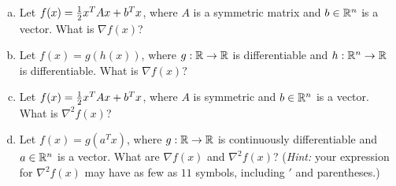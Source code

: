   \begin{enumerate}[(a)]
  \item \label{item:quadratic-gradient}
    Let $f(x) = \frac{1}{2} x^T A x + b^T x$, where $A$ is a symmetric matrix and
    $b \in \mathbb{R}^n$ is a vector. What is $\nabla f(x)$?

  \item \label{item:chain-rule}
    Let $f(x) = g(h(x))$, where $g : \mathbb{R} \to \mathbb{R}$ is
    differentiable and $h : \mathbb{R}^n \to \mathbb{R}$ is differentiable.
    What is $\nabla f(x)$?


  \item Let $f(x) = \frac{1}{2} x^T A x + b^T x$, where
    $A$ is symmetric and $b \in \mathbb{R}^n$ is a vector. What is
    $\nabla^2 f(x)$?

  \item Let $f(x) = g(a^T x)$, where $g : \mathbb{R} \to \mathbb{R}$ is continuously
    differentiable and $a \in \mathbb{R}^n$ is a vector.
    What are $\nabla f(x)$ and $\nabla^2 f(x)$?
    (\emph{Hint:} your expression for $\nabla^2 f(x)$ may have as few as
    $11$ symbols, including $'$ and parentheses.)

  \end{enumerate}

